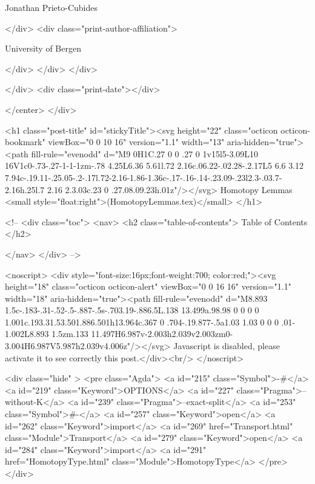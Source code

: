                   Jonathan Prieto-Cubides
                
              </div>
              <div class="print-author-affiliation">
                
                  University of Bergen
                
                </div>
            </div>
          </div>
          
          
        </div>
        <div class="print-date"></div>
        
        
    </center>
  </div>

  

  <h1 class="post-title" id="stickyTitle"><svg height="22" class="octicon octicon-bookmark" viewBox="0 0 10 16" version="1.1" width="13" aria-hidden="true"><path fill-rule="evenodd" d="M9 0H1C.27 0 0 .27 0 1v15l5-3.09L10 16V1c0-.73-.27-1-1-1zm-.78 4.25L6.36 5.61l.72 2.16c.06.22-.02.28-.2.17L5 6.6 3.12 7.94c-.19.11-.25.05-.2-.17l.72-2.16-1.86-1.36c-.17-.16-.14-.23.09-.23l2.3-.03.7-2.16h.25l.7 2.16 2.3.03c.23 0 .27.08.09.23h.01z"/></svg> Homotopy Lemmas <small style="float:right">(HomotopyLemmas.tex)</small>
  </h1>

  <!-- 
  <div class="toc">
    <nav>
    <h2 class="table-of-contents"> Table of Contents </h2>
      

    </nav>
  </div>
   -->

  <noscript>
  <div style="font-size:16px;font-weight:700; color:red;"><svg height="18" class="octicon octicon-alert" viewBox="0 0 16 16" version="1.1" width="18" aria-hidden="true"><path fill-rule="evenodd" d="M8.893 1.5c-.183-.31-.52-.5-.887-.5s-.703.19-.886.5L.138 13.499a.98.98 0 0 0 0 1.001c.193.31.53.501.886.501h13.964c.367 0 .704-.19.877-.5a1.03 1.03 0 0 0 .01-1.002L8.893 1.5zm.133 11.497H6.987v-2.003h2.039v2.003zm0-3.004H6.987V5.987h2.039v4.006z"/></svg> Javascript is disabled, please activate it to see correctly this post.</div><br/>
  </noscript>

  <div class="hide" >
<pre class="Agda">
<a id="215" class="Symbol">{-#</a> <a id="219" class="Keyword">OPTIONS</a> <a id="227" class="Pragma">--without-K</a> <a id="239" class="Pragma">--exact-split</a> <a id="253" class="Symbol">#-}</a>
<a id="257" class="Keyword">open</a> <a id="262" class="Keyword">import</a> <a id="269" href="Transport.html" class="Module">Transport</a>
<a id="279" class="Keyword">open</a> <a id="284" class="Keyword">import</a> <a id="291" href="HomotopyType.html" class="Module">HomotopyType</a>
</pre>
</div>


